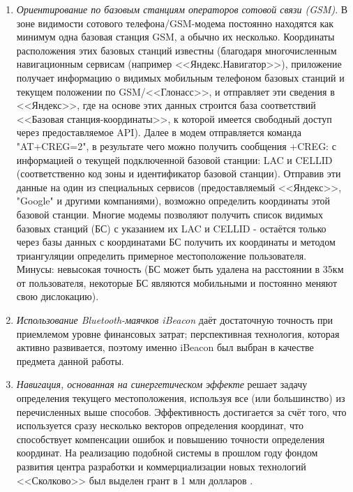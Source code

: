 \begin{enumerate}
    \item
    \textit{Ориентирование по базовым станциям операторов сотовой связи (GSM)}. В зоне видимости сотового телефона/GSM-модема постоянно находятся как минимум одна базовая станция GSM, а обычно их несколько. Координаты расположения этих базовых станций известны (благодаря многочисленным навигационным сервисам (например <<Яндекс.Навигатор>>), приложение получает информацию о видимых мобильным телефоном базовых станций и текущем положении по GSM/<<Глонасс>>, и отправляет эти сведения в <<Яндекс>>, где на основе этих данных строится база соответствий <<Базовая станция-координаты>>, к которой имеется свободный доступ через предоставляемое API). Далее в модем отправляется команда "AT+CREG=2", в результате чего можно получить сообщения +CREG: с информацией о текущей подключенной базовой станции: LAC и CELLID (соответственно код зоны и идентификатор базовой станции). Отправив эти данные на один из специальных сервисов (предоставляемый <<Яндекс>>, "Google" и другими компаниями), возможно определить координаты этой базовой станции. Многие модемы позволяют получить список видимых базовых станций (БС) с указанием их LAC и CELLID - остаётся только через базы данных с координатами БС получить их координаты и методом триангуляции определить примерное местоположение пользователя. \\
    Минусы: невысокая точность (БС может быть удалена на расстоянии в 35км от пользователя, некоторые БС являются мобильными и постоянно меняют свою дислокацию).
    \item
    \textit{Использование Bluetooth-маячков iBeacon} даёт достаточную точность при приемлемом уровне финансовых затрат; перспективная технология, которая активно развивается, поэтому именно iBeacon был выбран в качестве предмета данной работы.
    \item
    \textit{Навигация, основанная на синергетическом эффекте} решает задачу определения текущего местоположения, используя все (или большинство) из перечисленных выше способов. Эффективность достигается за счёт того, что используется сразу несколько векторов определения координат, что способствует компенсации ошибок и повышению точности определения координат. На реализацию подобной системы в прошлом году фондом развития центра разработки и коммерциализации новых технологий <<Сколково>> был выделен грант в 1 млн долларов \cite{web:HabrBig}.    
\end{enumerate}